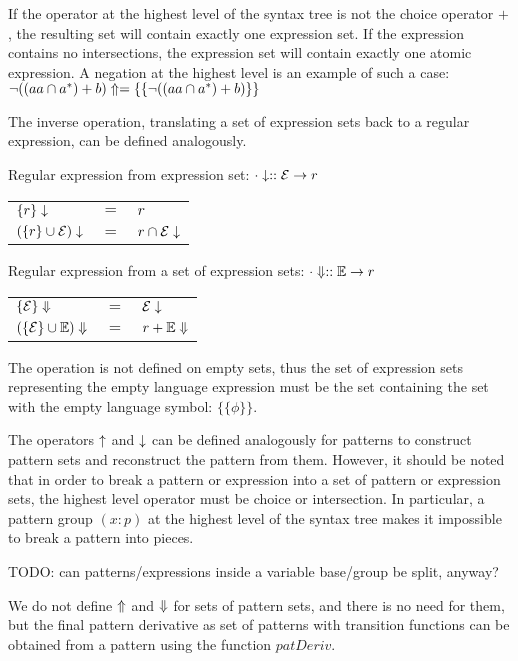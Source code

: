 If the operator at the highest level of the syntax tree is not the choice
operator $+$, the resulting set will contain exactly one expression set. If
the expression contains no intersections, the expression set will contain
exactly one atomic expression. A negation at the highest level is an example
of such a case:
$\neg((aa \cap a^*) + b)\Uparrow = \{\{\neg((aa \cap a^*) + b)\}\}$

The inverse operation, translating a set of expression sets back to a regular
expression, can be defined analogously.

Regular expression from expression set: $\cdot\downarrow :: \mathcal{E} \to r$

\begin{tabular}{lll}
   $\{r\}\downarrow$			& $=$	& $r$				\\
   $(\{r\} \cup \mathcal{E})\downarrow$	& $=$	& $r \cap \mathcal{E}\downarrow$	\\
\end{tabular}

Regular expression from a set of expression sets: $\cdot\Downarrow :: \mathbb{E} \to r$

\begin{tabular}{lll}
   $\{\mathcal{E}\}\Downarrow$		& $=$	& $\mathcal{E}\downarrow$		\\
   $(\{\mathcal{E}\} \cup \mathbb{E})\Downarrow$	& $=$	& $r + \mathbb{E}\Downarrow$	\\
\end{tabular}

The operation is not defined on empty sets, thus the set of expression sets
representing the empty language expression must be the set containing the set
with the empty language symbol: $\{\{\phi\}\}$.

The operators $\uparrow$ and $\downarrow$ can be defined analogously for
patterns to construct pattern sets and reconstruct the pattern from them.
However, it should be noted that in order to break a pattern or expression
into a set of pattern or expression sets, the highest level operator must be
choice or intersection. In particular, a pattern group $(x:p)$ at the highest
level of the syntax tree makes it impossible to break a pattern into pieces.

TODO: can patterns/expressions inside a variable base/group be split, anyway?

We do not define $\Uparrow$ and $\Downarrow$ for sets of pattern sets, and
there is no need for them, but the final pattern derivative as set of patterns
with transition functions can be obtained from a pattern using the function
$\mathit{patDeriv}$.

